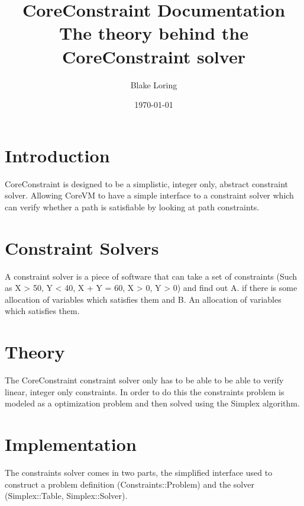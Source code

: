 \documentclass{report}
\begin{document}
\title{CoreConstraint Documentation \\ \large The theory behind the CoreConstraint solver}
\author{Blake Loring}
\date{\today}

\maketitle

\chapter {Introduction}

CoreConstraint is designed to be a simplistic, integer only, abstract constraint solver. Allowing CoreVM to have a simple interface to a constraint solver which can verify whether a path is satisfiable by looking at path constraints.

\chapter {Constraint Solvers}

A constraint solver is a piece of software that can take a set of constraints (Such as X > 50, Y < 40, X + Y = 60, X > 0, Y > 0) and find out A. if there is some allocation of variables which satisfies them and B. An allocation of variables which satisfies them.

\chapter {Theory}

The CoreConstraint constraint solver only has to be able to be able to verify linear, integer only constraints. In order to do this the constraints problem is modeled as a optimization problem and then solved using the Simplex algorithm.

\chapter {Implementation}

The constraints solver comes in two parts, the simplified interface used to construct a problem definition (Constraints::Problem) and the solver (Simplex::Table, Simplex::Solver).
\end{document}
